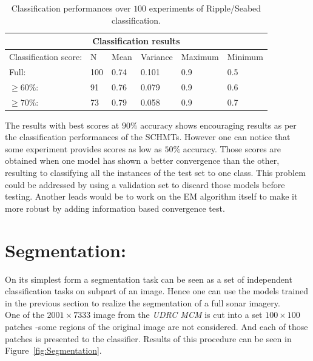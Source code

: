 \documentclass[a4paper,11pt]{report}
\begin{document}
		\begin{center}
			\begin{table}
				\begin{center}				
					\begin{tabular}{ |p{3cm}||p{2cm}|p{2cm}|p{2cm}|p{2cm}|p{2cm}| }
						\hline
						\multicolumn{6}{|c|}{Classification results} \\
						\hline
						Classification score:	&	N			& Mean	& Variance	& Maximum	& Minimum \\
						\hline
						Full:									& 100   & 0.74	& 0.101			& 0.9				&	0.5\\
						$\geq 60\%$: 					& 91    & 0.76	& 0.079			& 0.9				&	0.6\\
						$\geq 70\%$: 					& 73    & 0.79	& 0.058			& 0.9				&	0.7\\
						\hline
					\end{tabular}
					\label{table:Clf_ripple}
				\end{center}
				\caption{Classification performances over $100$ experiments of Ripple/Seabed classification.}
			\end{table}
		\end{center}
		
		The results with best scores at $90\%$ accuracy shows encouraging results as per the classification performances of the SCHMTs. However one can notice that some experiment provides scores as low as $50\%$ accuracy. Those scores are obtained when one model has shown a better convergence than the other, resulting to classifying all the instances of the test set to one class. This problem could be addressed by using a validation set to discard those models before testing. Another leads would be to work on the EM algorithm itself to make it more robust by adding information based convergence test.   
		
  \section{Segmentation:}
		\label{sec:Exp/Segmentation:}
		
		On its simplest form  a segmentation task can be seen as a set of independent classification tasks on subpart of an image. Hence one can use the models trained in the previous section to realize the segmentation of a full sonar imagery.\\
		
		One of the  $2001 \times 7333$ image from the \textit{UDRC MCM} is cut into a set $100 \times 100$ patches -some regions of the original image are not considered. And each of those patches is presented to the classifier. Results of this procedure can be seen in Figure~\ref{fig:Segmentation}.
		
\end{document}

